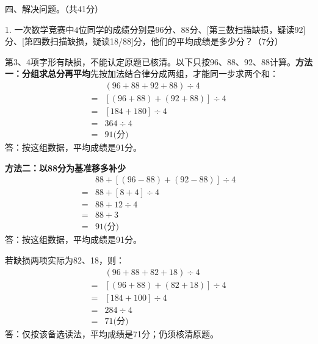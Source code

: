 四、解决问题。（共41分）\par 1. 一次数学竞赛中\(4\)位同学的成绩分别是\(96\)分、\(88\)分、[第三数扫描缺损，疑读92]分、[第四数扫描缺损，疑读18/88]分，他们的平均成绩是多少分？（7分）\par
\begin{BookAnswer}
第3、4项字形有缺损，不能认定原题已核清。以下只按96、88、92、88计算。\textbf{方法一：分组求总分再平均}先按加法结合律分成两组，才能同一步求两个和：\[\begin{aligned}&(96+88+92+88)\div4\\={}&[(96+88)+(92+88)]\div4\\={}&[184+180]\div4\\={}&364\div4\\={}&91\text{(分)}\end{aligned}\]答：按这组数据，平均成绩是91分。\par\textbf{方法二：以88分为基准移多补少}\[\begin{aligned}&88+[(96-88)+(92-88)]\div4\\={}&88+[8+4]\div4\\={}&88+12\div4\\={}&88+3\\={}&91\text{(分)}\end{aligned}\]答：按这组数据，平均成绩是91分。\par 若缺损两项实际为82、18，则：\[\begin{aligned}&(96+88+82+18)\div4\\={}&[(96+88)+(82+18)]\div4\\={}&[184+100]\div4\\={}&284\div4\\={}&71\text{(分)}\end{aligned}\]答：仅按该备选读法，平均成绩是71分；仍须核清原题。
\end{BookAnswer}

